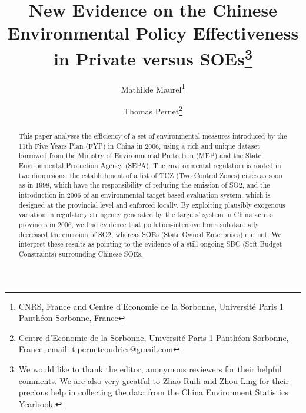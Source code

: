 \documentclass[12pt]{article}
\begin{document}
\begin{titlepage}


\title{New Evidence on the Chinese Environmental Policy Effectiveness in Private versus SOEs\thanks{We would like to thank the editor, anonymous reviewers for their helpful comments. We are also very greatful to Zhao Ruili and Zhou Ling for their precious help in collecting the data from the China Environment Statistics Yearbook.}}
\author{
Mathilde Maurel\thanks{CNRS, France and Centre d'Economie de la Sorbonne, Université Paris 1 Panthéon-Sorbonne, France} 
\and Thomas Pernet\thanks{Centre d'Economie de la Sorbonne, Université Paris 1 Panthéon-Sorbonne, France,
\href{mailto:t.pernetcoudrier@gmail.com}{email: t.pernetcoudrier@gmail.com} 
}
}


\date{}

\maketitle
\begin{abstract}
\noindent This paper analyses the efficiency of a set of environmental measures introduced by the 11th Five Years Plan (FYP) in China in 2006, using a rich and unique dataset borrowed from the Ministry of Environmental Protection (MEP) and the State Environmental Protection Agency (SEPA). The environmental regulation is rooted in two dimensions: the establishment of a list of TCZ (Two Control Zones) cities as soon as in 1998, which have the responsibility of reducing the emission of SO2, and the introduction in 2006 of an environmental target-based evaluation system, which is designed at the provincial level and enforced locally. By exploiting plausibly exogenous variation in regulatory stringency generated by the targets' system in China across provinces in 2006, we find evidence that pollution-intensive firms substantially decreased the emission of SO2, whereas SOEs (State Owned Enterprises) did not. We interpret these results as pointing to the evidence of a still ongoing SBC (Soft Budget Constraints) surrounding Chinese SOEs. 


\end{abstract}
\end{titlepage}
\end{document}
